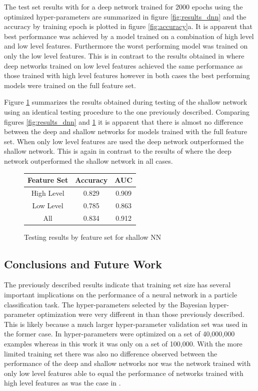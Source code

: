 \documentclass[12pt,letterpaper]{article}
\begin{document}
The test set results with for a deep network trained for 2000 epochs using the optimized hyper-parameters are summarized in figure \ref{fig:results_dnn} and the accuracy by training epoch is plotted in figure \ref{fig:accuracy}a.  It is apparent that best performance was achieved by a model trained on a combination of high level and low level features.  Furthermore  the worst performing model was trained on only the low level features.  This is in contrast to the results obtained in \cite{Baldi:2014pta} where deep networks trained on low level features achieved the same performance as those trained with high level features however in both cases the best performing models were trained on the full feature set.

Figure \ref{fig:results_nn} summarizes the results obtained during testing of the shallow network using an identical testing procedure to the one previously described.  Comparing figures \ref{fig:results_dnn} and \ref{fig:results_nn} it is apparent that there is almost no difference between the deep and shallow networks for models trained with the full feature set.  When only low level features are used the deep network outperformed the shallow network.  This is again in contrast to the results of \cite{Baldi:2014pta} where the deep network outperformed the shallow network in all cases.

\begin{figure}
\begin{center}
\tiny
 \begin{tabular}{|c| c c|} 
 \hline
 Feature Set & Accuracy & AUC \\ [0.5ex] 
 \hline\hline
 High Level & 0.829 & 0.909 \\[1ex] 
 \hline
 Low Level & 0.785 & 0.863 \\[1ex]
 \hline
 All & 0.834 & 0.912 \\[1ex]
 \hline

\end{tabular}
\caption{Testing results by feature set for shallow NN}
\label{fig:results_nn}
\end{center}
\end{figure}

\subsection{Conclusions and Future Work}
The previously described results indicate that training set size has several important implications on the performance of a neural network in a particle classification task.  The hyper-parameters selected by the Bayesian hyper-parameter optimization were very different in \cite{Baldi:2014pta} than those previously described.  This is likely because a much larger hyper-parameter validation set was used in the former case.  In \cite{Baldi:2014pta} hyper-parameters were optimized on a set of 40,000,000 examples whereas in this work it was only on  a set of 100,000.  With the more limited training set there was also no difference observed between the performance of the deep and shallow networks nor was the network trained with only low level features able to equal the performance of networks trained with high level features as was the case in \cite{Baldi:2014kfa}.
\end{document}
